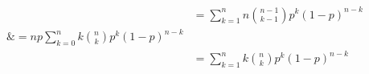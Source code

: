 \documentclass[preview]{standalone}
\begin{document}
\begin{align*}
&= \sum ^{n} _{k=1} n {{n-1}\choose{k-1}} p^{k} (1-p)^{n-k}\\ \&= n p \sum ^{n} _{k=0} k {n\choose{k}} p^{k} (1-p)^{n-k}\\ &= \sum ^{n} _{k=1} k {n\choose{k}} p^{k} (1-p)^{n-k}\\
\end{align*}
\end{document}
